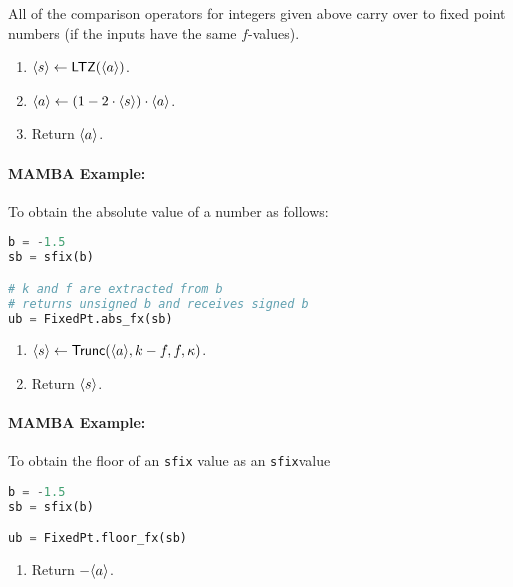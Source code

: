   All of the comparison operators for integers given above carry
  over to fixed point numbers (if the inputs have the same $f$-values).

  \begin{enumerate}
    \item $\langle s \rangle \leftarrow \mathsf{LTZ}(\langle a \rangle)$.
    \item $\langle a \rangle \leftarrow (1-2\cdot \langle s \rangle) \cdot \langle a \rangle$.
    \item Return $\langle a \rangle$.
  \end{enumerate}

  \paragraph{MAMBA Example:} To obtain the absolute value of a number as follows:
  \begin{lstlisting}[language={python}]
b = -1.5
sb = sfix(b)

# k and f are extracted from b
# returns unsigned b and receives signed b
ub = FixedPt.abs_fx(sb)
\end{lstlisting}

  \begin{enumerate}
    \item $\langle s \rangle \leftarrow \mathsf{Trunc}(\langle a \rangle, k-f, f, \kappa)$.
    \item Return $\langle s \rangle$.
  \end{enumerate}

  \paragraph{MAMBA Example:} To obtain the floor of an \verb+sfix+ value
  as an \verb+sfix+value
  \begin{lstlisting}[language={python}]
b = -1.5
sb = sfix(b)

ub = FixedPt.floor_fx(sb)
\end{lstlisting}

  \begin{enumerate}
    \item Return $-\langle a \rangle$.
  \end{enumerate}
